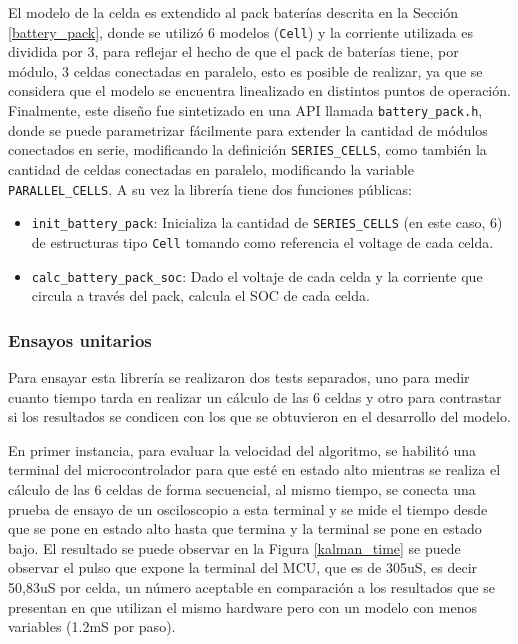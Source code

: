 \documentclass[10pt, a4paper]{article}
\newcounter{subsubsubsection}[subsubsection]
\begin{document}

El modelo de la celda es extendido al pack bater\'ias descrita en la Secci\'on
\ref{battery_pack}, donde se utiliz\'o 6 modelos (\texttt{Cell}) y la corriente
utilizada es dividida por 3, para reflejar el hecho de que el pack de bater\'ias 
tiene, por m\'odulo, 3 celdas conectadas en paralelo, esto es posible de 
realizar, ya que se considera que el modelo se encuentra linealizado en 
distintos puntos de operaci\'on. Finalmente, este diseño fue sintetizado en una
\acrshort{API} llamada \texttt{battery\_pack.h}, donde se puede parametrizar
f\'acilmente para extender la cantidad de m\'odulos conectados en serie, 
modificando la definici\'on \texttt{SERIES\_CELLS}, como tambi\'en la cantidad de
celdas conectadas en paralelo, modificando la variable \texttt{PARALLEL\_CELLS}. 
A su vez la librer\'ia tiene dos funciones p\'ublicas:

\begin{itemize}
    \item \texttt{init\_battery\_pack}: Inicializa la cantidad de
        \texttt{SERIES\_CELLS} (en este caso, 6) de estructuras tipo 
        \texttt{Cell} tomando como referencia el voltage de cada celda.
    \item \texttt{calc\_battery\_pack\_soc}: Dado el voltaje de cada celda y la
        corriente que circula a trav\'es del pack, calcula el \acrshort{SOC} de
        cada celda.
\end{itemize}

\subsubsection{Ensayos unitarios}

Para ensayar esta librer\'ia se realizaron dos tests separados, uno para medir
cuanto tiempo tarda en realizar un c\'alculo de las 6 celdas y otro para
contrastar si los resultados se condicen con los que se obtuvieron en el
desarrollo del modelo.

En primer instancia, para evaluar la velocidad del algoritmo, se habilit\'o una
terminal del microcontrolador para que est\'e en estado alto mientras se realiza
el c\'alculo de las 6 celdas de forma secuencial, al mismo tiempo, se conecta
una prueba de ensayo de un osciloscopio a esta terminal y se mide el tiempo
desde que se pone en estado alto hasta que termina y la terminal se pone en
estado bajo. El resultado se puede observar en la Figura \ref{kalman_time} se
puede observar el pulso que expone la terminal del \acrshort{MCU}, que es de
305uS, es decir 50,83uS por celda, un n\'umero aceptable en comparaci\'on a los
resultados que se presentan en \cite{kalman_filter_embedded} que utilizan el
mismo hardware pero con un modelo con menos variables (1.2mS por paso).
\end{document}
